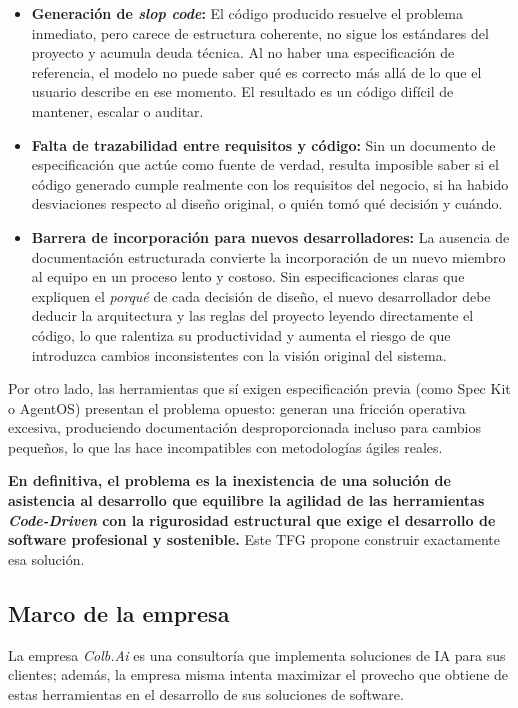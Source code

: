 \documentclass[11pt, letterpaper]{article}
\begin{document}
\begin{itemize}
    \item \textbf{Generación de \textit{slop code}:} El código producido resuelve el problema inmediato, pero carece de estructura coherente, no sigue los estándares del proyecto y acumula deuda técnica. Al no haber una especificación de referencia, el modelo no puede saber qué es correcto más allá de lo que el usuario describe en ese momento. El resultado es un código difícil de mantener, escalar o auditar.

    \item \textbf{Falta de trazabilidad entre requisitos y código:} Sin un documento de especificación que actúe como fuente de verdad, resulta imposible saber si el código generado cumple realmente con los requisitos del negocio, si ha habido desviaciones respecto al diseño original, o quién tomó qué decisión y cuándo.

    \item \textbf{Barrera de incorporación para nuevos desarrolladores:} La ausencia de documentación estructurada convierte la incorporación de un nuevo miembro al equipo en un proceso lento y costoso. Sin especificaciones claras que expliquen el \textit{porqué} de cada decisión de diseño, el nuevo desarrollador debe deducir la arquitectura y las reglas del proyecto leyendo directamente el código, lo que ralentiza su productividad y aumenta el riesgo de que introduzca cambios inconsistentes con la visión original del sistema.
\end{itemize}

Por otro lado, las herramientas que sí exigen especificación previa (como Spec Kit o AgentOS) presentan el problema opuesto: generan una fricción operativa excesiva, produciendo documentación desproporcionada incluso para cambios pequeños, lo que las hace incompatibles con metodologías ágiles reales.

\textbf{En definitiva, el problema es la inexistencia de una solución de asistencia al desarrollo que equilibre la agilidad de las herramientas \textit{Code-Driven} con la rigurosidad estructural que exige el desarrollo de software profesional y sostenible.} Este TFG propone construir exactamente esa solución.

\subsection{Marco de la empresa}

La empresa \textit{Colb.Ai} es una consultoría que implementa soluciones de IA para sus clientes; además, la empresa misma intenta maximizar el provecho que obtiene de estas herramientas en el desarrollo de sus soluciones de software.
\end{document}
